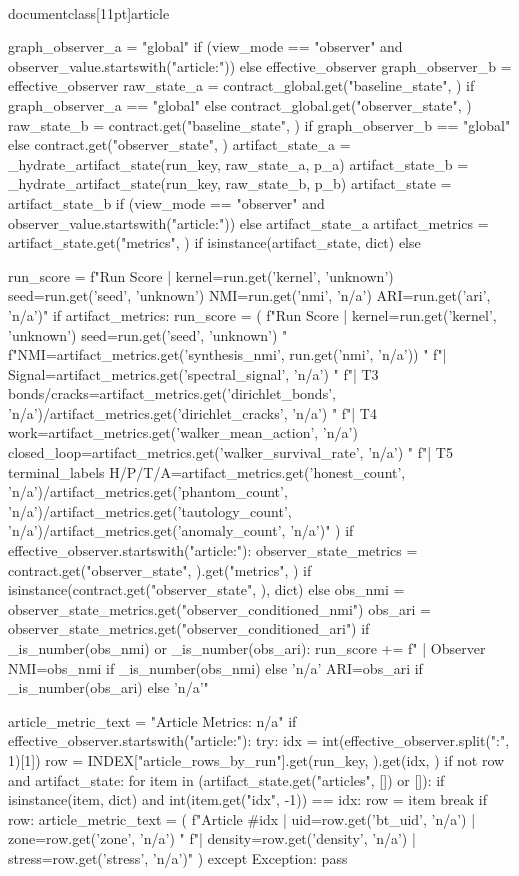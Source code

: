 \\documentclass[11pt]{article}
\begin{document}
\begin{CodeBlock}
{{{{{{{{    graph_observer_a = "global" if (view_mode == "observer" and observer_value.startswith("article:")) else effective_observer
    graph_observer_b = effective_observer
    raw_state_a = contract_global.get("baseline_state", {}) if graph_observer_a == "global" else contract_global.get("observer_state", {})
    raw_state_b = contract.get("baseline_state", {}) if graph_observer_b == "global" else contract.get("observer_state", {})
    artifact_state_a = _hydrate_artifact_state(run_key, raw_state_a, p_a)
    artifact_state_b = _hydrate_artifact_state(run_key, raw_state_b, p_b)
    artifact_state = artifact_state_b if (view_mode == "observer" and observer_value.startswith("article:")) else artifact_state_a
    artifact_metrics = artifact_state.get("metrics", {}) if isinstance(artifact_state, dict) else {}

    run_score = f"Run Score | kernel={run.get('kernel', 'unknown')} seed={run.get('seed', 'unknown')} NMI={run.get('nmi', 'n/a')} ARI={run.get('ari', 'n/a')}"
    if artifact_metrics:
        run_score = (
            f"Run Score | kernel={run.get('kernel', 'unknown')} seed={run.get('seed', 'unknown')} "
            f"NMI={artifact_metrics.get('synthesis_nmi', run.get('nmi', 'n/a'))} "
            f"| Signal={artifact_metrics.get('spectral_signal', 'n/a')} "
            f"| T3 bonds/cracks={artifact_metrics.get('dirichlet_bonds', 'n/a')}/{artifact_metrics.get('dirichlet_cracks', 'n/a')} "
            f"| T4 work={artifact_metrics.get('walker_mean_action', 'n/a')} closed_loop={artifact_metrics.get('walker_survival_rate', 'n/a')} "
            f"| T5 terminal_labels H/P/T/A={artifact_metrics.get('honest_count', 'n/a')}/{artifact_metrics.get('phantom_count', 'n/a')}/{artifact_metrics.get('tautology_count', 'n/a')}/{artifact_metrics.get('anomaly_count', 'n/a')}"
        )
    if effective_observer.startswith("article:"):
        observer_state_metrics = contract.get("observer_state", {}).get("metrics", {}) if isinstance(contract.get("observer_state", {}), dict) else {}
        obs_nmi = observer_state_metrics.get("observer_conditioned_nmi")
        obs_ari = observer_state_metrics.get("observer_conditioned_ari")
        if _is_number(obs_nmi) or _is_number(obs_ari):
            run_score += f" | Observer NMI={obs_nmi if _is_number(obs_nmi) else 'n/a'} ARI={obs_ari if _is_number(obs_ari) else 'n/a'}"

    article_metric_text = "Article Metrics: n/a"
    if effective_observer.startswith("article:"):
        try:
            idx = int(effective_observer.split(":", 1)[1])
            row = INDEX["article_rows_by_run"].get(run_key, {}).get(idx, {})
            if not row and artifact_state:
                for item in (artifact_state.get("articles", []) or []):
                    if isinstance(item, dict) and int(item.get("idx", -1)) == idx:
                        row = item
                        break
            if row:
                article_metric_text = (
                    f"Article #{idx} | uid={row.get('bt_uid', 'n/a')} | zone={row.get('zone', 'n/a')} "
                    f"| density={row.get('density', 'n/a')} | stress={row.get('stress', 'n/a')}"
                )
        except Exception:
            pass

}}}}}}}}
\end{CodeBlock}
\end{document}
